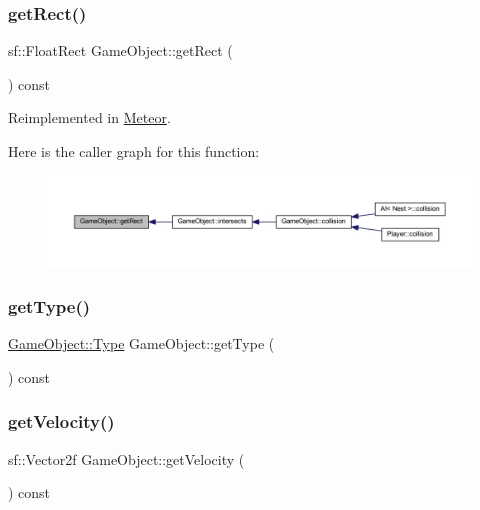 \subsubsection{\texorpdfstring{get\+Rect()}{getRect()}}
{\footnotesize\ttfamily sf\+::\+Float\+Rect Game\+Object\+::get\+Rect (\begin{DoxyParamCaption}{ }\end{DoxyParamCaption}) const\hspace{0.3cm}{\ttfamily [virtual]}}



Reimplemented in \hyperlink{class_meteor_a7db7163153835475758d65e983086120}{Meteor}.

Here is the caller graph for this function\+:
\nopagebreak
\begin{figure}[H]
\begin{center}
\leavevmode
\includegraphics[width=350pt]{class_game_object_aecc23e1558ae04e10083deae74774bd2_icgraph}
\end{center}
\end{figure}
\mbox{\label{class_game_object_a7d0bd9217fe8bf225ec815ab9e0f70f8}} 
\subsubsection{\texorpdfstring{get\+Type()}{getType()}}
{\footnotesize\ttfamily \hyperlink{class_game_object_a4bf9e8f660e6a49f1b802c2aa9dd95af}{Game\+Object\+::\+Type} Game\+Object\+::get\+Type (\begin{DoxyParamCaption}{ }\end{DoxyParamCaption}) const}

\mbox{\label{class_game_object_aa96a0ccbe6b1ab87b643306e1f02806c}} 
\subsubsection{\texorpdfstring{get\+Velocity()}{getVelocity()}}
{\footnotesize\ttfamily sf\+::\+Vector2f Game\+Object\+::get\+Velocity (\begin{DoxyParamCaption}{ }\end{DoxyParamCaption}) const}

